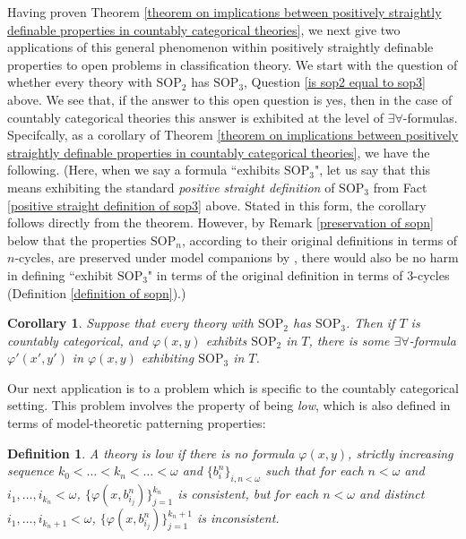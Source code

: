\documentclass[10pt,a4paper]{amsart}
\newtheorem{corollary}{Corollary}
\newtheorem{definition}{Definition}
\begin{document}
Having proven Theorem \ref{theorem on implications between positively straightly definable properties in countably categorical theories}, we next give two applications of this general phenomenon within positively straightly definable properties to open problems in classification theory. We start with the question of whether every theory with $\mathrm{SOP}_{2}$  has $\mathrm{SOP}_{3}$, Question \ref{is sop2 equal to sop3} above. We see that, if the answer to this open question is yes, then in the case of countably categorical theories this answer is exhibited at the level of $\exists\forall$-formulas. Specifcally, as a corollary of Theorem \ref{theorem on implications between positively straightly definable properties in countably categorical theories}, we have the following. (Here, when we say a formula ``exhibits $\mathrm{SOP}_{3}$", let us say that this means exhibiting the standard \textit{positive straight definition} of $\mathrm{SOP}_{3}$ from Fact \ref{positive straight definition of sop3} above. Stated in this form, the corollary follows directly from the theorem. However, by Remark \ref{preservation of sopn} below that the properties $\mathrm{SOP}_{n}$, according to their original definitions in terms of $n$-cycles, are preserved under model companions by \cite{bodirsky2025taking}, there would also be no harm in defining ``exhibit $\mathrm{SOP}_{3}$" in terms of the original definition in terms of $3$-cycles (Definition \ref{definition of sopn}).)



\begin{corollary}
Suppose that every theory with $\mathrm{SOP}_{2}$  has $\mathrm{SOP}_{3}$. Then if $T$ is countably categorical, and $\varphi(x, y)$ exhibits $\mathrm{SOP}_{2}$ in $T$, there is some $\exists\forall$-formula $\varphi'(x', y')$ in $\varphi(x, y)$ exhibiting $\mathrm{SOP}_{3}$ in $T$.
\end{corollary}

Our next application is to a problem which is specific to the countably categorical setting. This problem involves the property of being \textit{low}, which is also defined in terms of model-theoretic patterning properties:

\begin{definition}
A theory is \textit{low} if there is no formula $\varphi(x, y)$, strictly increasing sequence $k_{0} < \ldots < k_{n} < \ldots < \omega$ and $\{b^{n}_{i}\}_{i, n < \omega}$ such that for each $n< \omega$ and $i_{1}, \ldots, i_{k_{n}} < \omega$, $\{\varphi(x, b^{n}_{i_{j}})\}^{k_{n}}_{j =1}$ is consistent, but for each $n< \omega$ and distinct $i_{1}, \ldots, i_{k_{n}+1} < \omega$, $\{\varphi(x, b^{n}_{i_{j}})\}^{k_{n}+1}_{j =1}$ is inconsistent.
\end{definition}
\end{document}
